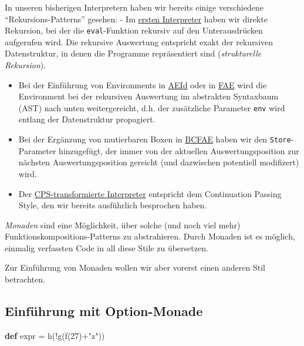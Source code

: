 \documentclass[]{article}
\newenvironment{Shaded}{}{}
\newcommand{\DecValTok}[1]{\textcolor[rgb]{0.25,0.63,0.44}{#1}}
\newcommand{\FunctionTok}[1]{\textcolor[rgb]{0.02,0.16,0.49}{#1}}
\newcommand{\KeywordTok}[1]{\textcolor[rgb]{0.00,0.44,0.13}{\textbf{#1}}}
\newcommand{\NormalTok}[1]{#1}
\newcommand{\StringTok}[1]{\textcolor[rgb]{0.25,0.44,0.63}{#1}}
\begin{document}
In unseren bisherigen Interpretern haben wir bereits einige verschiedene
``Rekursions-Patterns'' gesehen: - Im
\protect\hyperlink{erster-interpreter-ae}{ersten Interpreter} haben wir
direkte Rekursion, bei der die \texttt{eval}-Funktion rekursiv auf den
Unterausdrücken aufgerufen wird. Die rekursive Auswertung entspricht
exakt der rekursiven Datenstruktur, in denen die Programme repräsentiert
sind (\emph{strukturelle Rekursion}).

\begin{itemize}
\item
  Bei der Einführung von Environments in
  \protect\hyperlink{identifier-mit-umgebung-aeid}{AEId} oder in
  \protect\hyperlink{closures}{FAE} wird die Environment bei der
  rekursiven Auswertung im abstrakten Syntaxbaum (AST) nach unten
  weitergereicht, d.h. der zusätzliche Parameter \texttt{env} wird
  entlang der Datenstruktur propagiert.
\item
  Bei der Ergänzung von mutierbaren Boxen in
  \protect\hyperlink{interpreter}{BCFAE} haben wir den
  \texttt{Store}-Parameter hinzugefügt, der immer von der aktuellen
  Auswertungsposition zur nächsten Auswertungsposition gereicht (und
  dazwischen potentiell modifizert) wird.
\item
  Der
  \protect\hyperlink{fae-mit-first-class-continuations}{CPS-transformierte
  Interpreter} entspricht dem Continuation Passing Style, den wir
  bereits ausführlich besprochen haben.
\end{itemize}

\emph{Monaden} sind eine Möglichkeit, über solche (und noch viel mehr)
Funktionskompositions-Patterns zu abstrahieren. Durch Monaden ist es
möglich, einmalig verfassten Code in all diese Stile zu übersetzen.

Zur Einführung von Monaden wollen wir aber vorerst einen anderen Stil
betrachten.

\hypertarget{einfuxfchrung-mit-option-monade}{%
\subsection{Einführung mit
Option-Monade}\label{einfuxfchrung-mit-option-monade}}

\begin{Shaded}
\begin{Highlighting}[]
\KeywordTok{def}\NormalTok{ expr = }\FunctionTok{h}\NormalTok{(!}\FunctionTok{g}\NormalTok{(}\FunctionTok{f}\NormalTok{(}\DecValTok{27}\NormalTok{)+}\StringTok{"z"}\NormalTok{))}
\end{Highlighting}
\end{Shaded}
\end{document}
